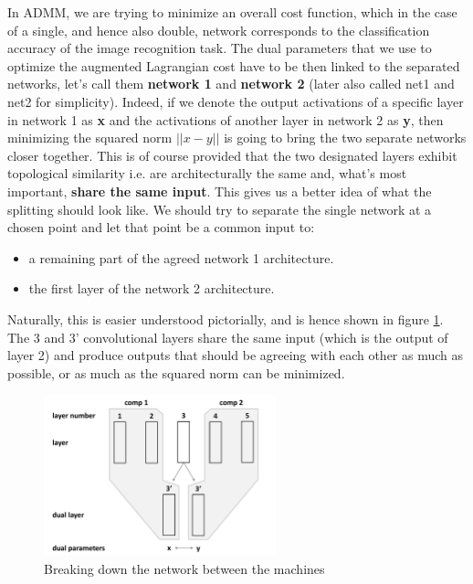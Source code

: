 \documentclass[a4paper, 12pt]{article}
\numberwithin{equation}{section}
\begin{document}
	In ADMM, we are trying to minimize an overall cost function, which in the case of a single, and hence also double, network corresponds to the classification accuracy of the image recognition task. The dual parameters that we use to optimize the augmented Lagrangian cost have to be then linked to the separated networks, let's call them \textbf{network 1} and \textbf{network 2} (later also called net1 and net2 for simplicity). Indeed, if we denote the output activations of a specific layer in network 1 as \textbf{x} and the activations of another layer in network 2 as \textbf{y}, then minimizing the squared norm $||x-y||$ is going to bring the two separate networks closer together. This is of course provided that the two designated layers exhibit topological similarity i.e. are architecturally the same and, what's most important, \textbf{share the same input}. This gives us a better idea of what the splitting should look like. We should try to separate the single network at a chosen point and let that point be a common input to:
	\begin{itemize}
		\item a remaining part of the agreed network 1 architecture.
		\item the first layer of the network 2 architecture.
	\end{itemize}

	Naturally, this is easier understood pictorially, and is hence shown in figure \ref{fig:dual-training}. The 3 and 3' convolutional layers share the same input (which is the output of layer 2) and produce outputs that should be agreeing with each other as much as possible, or as much as the squared norm can be minimized.

	\begin{figure}[!h]
		\centering
		\includegraphics[page=1,width=0.60\textwidth]{dual-training.pdf}
		\caption{\label{fig:dual-training}{Breaking down the network between the machines}}
	\end{figure}
\end{document}
